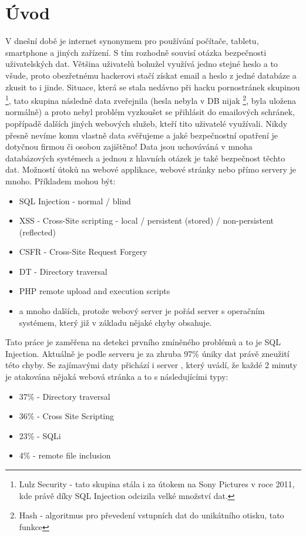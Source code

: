 \documentclass[12pt, a4paper]{report}
\begin{document}
\chapter{Úvod}
V dnešní době je internet synonymem pro používání počítače, tabletu, smartphone a jiných zařízení. S tím rozhodně souvisí otázka bezpečnosti uživatelských dat. Většina uživatelů bohužel využívá jedno stejné heslo a to všude, proto obezřetnému hackerovi stačí získat email a heslo z jedné databáze a zkusit to i jinde. Situace, která se stala nedávno při hacku pornostránek skupinou \footnote{Lulz Security - tato skupina stála i za útokem na Sony Pictures v roce 2011, kde právě díky SQL Injection odcizila velké množství dat.}, tato skupina následně data zveřejnila (hesla nebyla v DB nijak \footnote{Hash - algoritmus pro převedení vstupních dat do unikátního otisku, tato funkce }, byla uložena normálně) a proto nebyl problém vyzkoušet se přihlásit do emailových schránek, popřípadě dalších jiných webových služeb, kteří tito uživatelé využívali. Nikdy přesně nevíme komu vlastně  data svěřujeme a jaké bezpečnostní opatření je dotyčnou firmou či osobou zajištěno! Data jsou uchováváná v mnoha databázových systémech a jednou z hlavních otázek je také bezpečnost těchto dat. Možností útoků na webové applikace, webové stránky nebo přímo servery je mnoho. Příkladem mohou být:
\begin{itemize}
\item SQL Injection - normal / blind
\item XSS - Cross-Site scripting - local / persistent (stored) / non-persistent (reflected)
\item CSFR - Cross-Site Request Forgery 
\item DT - Directory traversal
\item PHP remote upload and execution scripts
\item a mnoho dalších, protože webový server je pořád server s operačním systémem, který již v základu nějaké chyby obsahuje.
\end{itemize}
Tato práce je zaměřena na detekci prvního zmíněného problémů a to je SQL Injection. Aktuálně je podle serveru  je za zhruba 97\% úniky dat právě zneužití této chyby. Se zajímavými daty přichází i server , který uvádí, že každé 2 minuty je atakována nějaká webová stránka a to s následujícími typy:
\begin{itemize}
\item 37\% - Directory traversal
\item 36\% - Cross Site Scripting
\item 23\% - SQLi
\item 4\% - remote file inclusion
\end{itemize}
\end{document}
